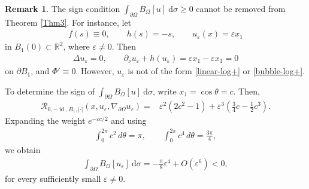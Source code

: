 \documentclass[reqno, 11pt]{amsart} %
\numberwithin{equation}{section}
\theoremstyle{definition}
\newtheorem{rmk}[thm]{Remark}
\newcommand{\pa}{\partial}
\newcommand{\R}{\mathbb{R}}
\newcommand{\calR}{\mathcal{R}}
\begin{document}
\begin{rmk}\label{ex:BR-is-essential}
The sign condition $\int_{\pa \Omega} B_{\Omega}[u] \ \text{d} \sigma \geq 0$ cannot be removed from Theorem \ref{Thm3}. For instance, let
\begin{align*}
       f(s)\equiv0,\qquad h(s)=-s,
       \qquad u_\varepsilon(x)=\varepsilon x_1
\end{align*}
in $B_1(0)\subset\R^2$, where $\varepsilon\ne0$.  Then
\begin{align*}
       \Delta u_\varepsilon=0,
       \qquad
       \partial_\nu u_\varepsilon+h(u_\varepsilon)
       =\varepsilon x_1-\varepsilon x_1=0
\end{align*}
on $\partial B_1$, and $\Phi'\equiv0$. However, $u_{\varepsilon}$ is not of the form \eqref{linear-log+} or \eqref{bubble-log+}.

To determine the sign of $\int_{\pa \Omega} B_{\Omega}[u] \ \text{d} \sigma$, write $x_1=\cos\theta=c$. Then,
\begin{align*}
    \calR_{0,-\operatorname{id},B_1,|\cdot|}
       (x,u_\varepsilon,\nabla_{\pa \Omega} u_\varepsilon) = &\varepsilon^2 (2c^2-1) + \varepsilon^3 \left(\frac{3}{4}c - \frac{1}{2}c^3\right).
\end{align*}
Expanding the weight $e^{-\varepsilon c/2}$ and using
\begin{align*}
       \int_0^{2\pi}c^2\,d\theta=\pi,
       \qquad
       \int_0^{2\pi}c^4\,d\theta=\frac{3\pi}{4},
\end{align*}
we obtain
\begin{align*}
      \int_{\pa \Omega} B_{\Omega}[u_{\varepsilon}] \ \text{d} \sigma
       =-\frac\pi8\varepsilon^4+O(\varepsilon^6)<0,
\end{align*}
for every sufficiently small $\varepsilon\ne0$.
\end{rmk}






\end{document}
